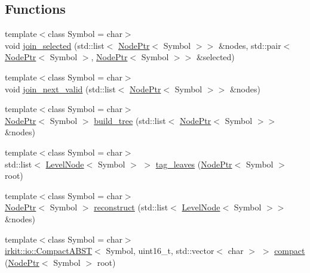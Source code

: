 \subsection*{Functions}
\begin{DoxyCompactItemize}
\item 
{\footnotesize template$<$class Symbol  = char$>$ }\\void \mbox{\hyperlink{namespaceirkit_1_1coding_1_1hutucker_abbc70e1f6cfcebe43ca85c70080c103f}{join\+\_\+selected}} (std\+::list$<$ \mbox{\hyperlink{namespaceirkit_1_1coding_1_1hutucker_a3fd5bcbd5c6d608f75e0afbb7f171899}{Node\+Ptr}}$<$ Symbol $>$$>$ \&nodes, std\+::pair$<$ \mbox{\hyperlink{namespaceirkit_1_1coding_1_1hutucker_a3fd5bcbd5c6d608f75e0afbb7f171899}{Node\+Ptr}}$<$ Symbol $>$, \mbox{\hyperlink{namespaceirkit_1_1coding_1_1hutucker_a3fd5bcbd5c6d608f75e0afbb7f171899}{Node\+Ptr}}$<$ Symbol $>$$>$ \&selected)
\item 
{\footnotesize template$<$class Symbol  = char$>$ }\\void \mbox{\hyperlink{namespaceirkit_1_1coding_1_1hutucker_a634a32e3cd6736a17e7e65c59af92f55}{join\+\_\+next\+\_\+valid}} (std\+::list$<$ \mbox{\hyperlink{namespaceirkit_1_1coding_1_1hutucker_a3fd5bcbd5c6d608f75e0afbb7f171899}{Node\+Ptr}}$<$ Symbol $>$$>$ \&nodes)
\item 
{\footnotesize template$<$class Symbol  = char$>$ }\\\mbox{\hyperlink{namespaceirkit_1_1coding_1_1hutucker_a3fd5bcbd5c6d608f75e0afbb7f171899}{Node\+Ptr}}$<$ Symbol $>$ \mbox{\hyperlink{namespaceirkit_1_1coding_1_1hutucker_a77fa0b99ad3161c99f17821181e0025d}{build\+\_\+tree}} (std\+::list$<$ \mbox{\hyperlink{namespaceirkit_1_1coding_1_1hutucker_a3fd5bcbd5c6d608f75e0afbb7f171899}{Node\+Ptr}}$<$ Symbol $>$$>$ \&nodes)
\item 
{\footnotesize template$<$class Symbol  = char$>$ }\\std\+::list$<$ \mbox{\hyperlink{structirkit_1_1coding_1_1hutucker_1_1LevelNode}{Level\+Node}}$<$ Symbol $>$ $>$ \mbox{\hyperlink{namespaceirkit_1_1coding_1_1hutucker_a6ae88a7692d28d80019e464a2f812b92}{tag\+\_\+leaves}} (\mbox{\hyperlink{namespaceirkit_1_1coding_1_1hutucker_a3fd5bcbd5c6d608f75e0afbb7f171899}{Node\+Ptr}}$<$ Symbol $>$ root)
\item 
{\footnotesize template$<$class Symbol  = char$>$ }\\\mbox{\hyperlink{namespaceirkit_1_1coding_1_1hutucker_a3fd5bcbd5c6d608f75e0afbb7f171899}{Node\+Ptr}}$<$ Symbol $>$ \mbox{\hyperlink{namespaceirkit_1_1coding_1_1hutucker_ad86ce5637698c2219a68ceabfa7f37b5}{reconstruct}} (std\+::list$<$ \mbox{\hyperlink{structirkit_1_1coding_1_1hutucker_1_1LevelNode}{Level\+Node}}$<$ Symbol $>$$>$ \&nodes)
\item 
{\footnotesize template$<$class Symbol  = char$>$ }\\\mbox{\hyperlink{classirkit_1_1io_1_1CompactABST}{irkit\+::io\+::\+Compact\+A\+B\+ST}}$<$ Symbol, uint16\+\_\+t, std\+::vector$<$ char $>$ $>$ \mbox{\hyperlink{namespaceirkit_1_1coding_1_1hutucker_a7c24cbbeaea86c42d88569db9c34321c}{compact}} (\mbox{\hyperlink{namespaceirkit_1_1coding_1_1hutucker_a3fd5bcbd5c6d608f75e0afbb7f171899}{Node\+Ptr}}$<$ Symbol $>$ root)
\end{DoxyCompactItemize}


